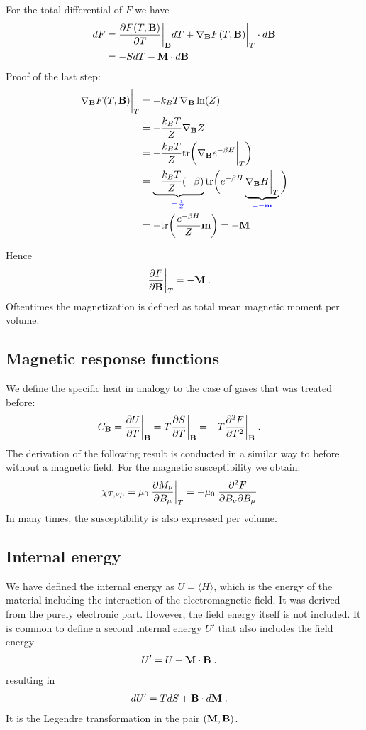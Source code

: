 For the total differential of $F$ we have
%
\begin{align*}
dF &= \frac{\partial F(T,\mathbf B)}{\partial T}\bigg|_{\mathbf B} dT + \nabla_{\mathbf B} F(T,\mathbf B)\bigg|_{T} \cdot d\mathbf B\\
&= - S dT - \mathbf M \cdot d\mathbf B
\end{align*}
%
Proof of the last step:
%
\begin{align*}
 \nabla_{\mathbf B} F(T,\mathbf B)\bigg|_{T} &=-k_{B}T  \nabla_{\mathbf B} \ln(Z)\\
 &=-\frac{k_{B}T}{Z}  \nabla_{\mathbf B} Z\\
 &= -\frac{k_{B}T }{Z}\text{tr} \bigg(\nabla_{\mathbf B} e^{-\beta H}\bigg|_{T}\bigg) \\
  &= \underbrace{
-\frac{k_{B}T}{Z} (-\beta)
}_{\color{blue} = \frac{1}{Z}} \text{tr} \bigg(e^{-\beta H} \underbrace{
\nabla_{\mathbf B} H\bigg|_{T} 
}_{\color{blue} = -\mathbf m}\bigg)\\
&=- \text{tr} \bigg( \frac{e^{-\beta H}}{Z} \mathbf m\bigg) = -\mathbf M
\end{align*}
%

Hence
%
\begin{align}\label{eq:}
\frac{\partial F}{\partial \mathbf B}\bigg|_{T} &= -\mathbf M\;.
\end{align}
%
{\color{blue}Oftentimes the magnetization is defined as total mean magnetic moment per volume.}

\subsection{Magnetic response functions}

We define the specific heat in analogy to the case of gases that was treated before:
%
\begin{align}
C_{\mathbf B} &= \frac{\partial U}{\partial T}\bigg|_{\mathbf B}  = T \frac{\partial S}{\partial T}\bigg|_{\mathbf B}
=-T\frac{\partial^{2} F}{\partial T^{2}} \bigg|_{\mathbf B}\;.
\end{align}
%
The derivation of the following result is conducted in a similar way to before without a magnetic field. For the magnetic susceptibility we obtain:
%
\begin{align}
\chi_{T,\nu\mu} &=\mu_{0}\;\frac{\partial M_{\nu}}{\partial B_{\mu}}\bigg|_{T} =
- \mu_{0}\;\frac{\partial^{2} F}{\partial B_{\nu} \partial B_{\mu}}
\end{align}
%
{\color{blue}In many times, the susceptibility is also expressed per volume.}
\subsection{Internal energy}
We have defined the internal energy as $U=\langle H \rangle$, which is the energy of the material including the interaction of the electromagnetic field. 
It was derived from the purely electronic part.
However, the field energy itself is not included. It is common to define a second internal energy $U'$ that also includes the 
field energy
%
\begin{align}\label{eq:}
U' &= U + \mathbf M\cdot \mathbf B\;.
\end{align}
%
resulting in 
%
\begin{align*}
d U' &= T dS + \mathbf B\cdot d\mathbf M \;.
\end{align*}
%
It is the Legendre transformation in the pair $(\mathbf M,\mathbf B)$.

